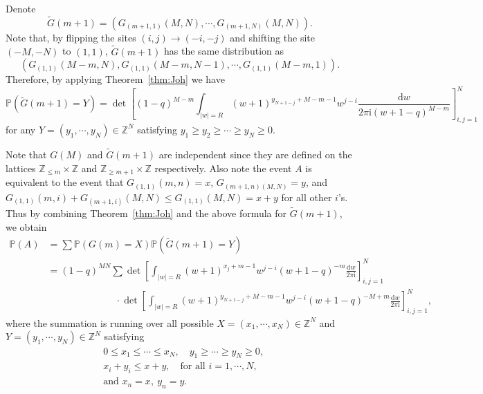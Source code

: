 \documentclass{article}
\numberwithin{equation}{section}
\newcommand{\ddbar}[2]{\frac{{\mathrm d}#1}{2\pi {\mathrm i}#2}}
\newcommand{\intZ}{\mathbb{Z}}
\newcommand{\prob}{\mathbb{P}}
\begin{document}
Denote
\begin{equation*}
	\tilde G(m+1) = \left( G_{(m+1,1)}(M,N),\cdots,G_{(m+1,N)}(M,N)\right).
\end{equation*}
Note that, by flipping the sites $(i,j)\to (-i,-j)$ and shifting the site $(-M,-N)$ to $(1,1)$, $\tilde G(m+1)$ has the same distribution as 
\begin{equation*}
	\left(G_{(1,1)}(M-m,N),G_{(1,1)}(M-m,N-1),\cdots,G_{(1,1)}(M-m,1)\right).
\end{equation*}
Therefore, by applying Theorem~\ref{thm:Joh} we have
		\begin{equation*}
		\prob\left( \tilde G(m+1)=Y
		     \right)
		 =  \det
		      \left[
		           (1-q)^{M-m} \int_{|w|=R}
		                       (w+1)^{y_{N+1-j}+M-m-1}w^{j-i}
		                       \ddbar{w}{(w+1-q)^{M-m}}
		      \right]_{i,j=1}^N
	\end{equation*}
for any $Y=(y_1,\cdots,y_N)\in\intZ^N$ satisfying $y_1\ge y_2\ge\cdots\ge y_N\ge 0$.

Note that $G(M)$ and $\tilde G(m+1)$ are independent since they are defined on the lattices $\intZ_{\le m}\times\intZ$ and $\intZ_{\ge m+1}\times \intZ$ respectively. Also note the event $A$ is equivalent to the event that $G_{(1,1)}(m,n)=x$, $G_{(m+1,n)(M,N)}=y$, and $G_{(1,1)}(m,i)+G_{(m+1,i)}(M,N)\le G_{(1,1)}(M,N)=x+y$ for all other $i$'s. Thus by combining Theorem~\ref{thm:Joh} and the above formula for $\tilde G(m+1)$, we obtain
\begin{equation}
	\label{eq:PA_01}
	\begin{split}
      \prob(A)
		&= \sum \prob\left(G(m) =X \right) \prob\left( \tilde G(m+1) = Y\right)\\
		&= (1-q)^{MN} \sum   \det 
		                      \left[
		                         \int_{|w|=R}
		                           (w+1)^{x_j+m-1}w^{j-i}(w+1-q)^{-m}\ddbar{w}{}
		                      \right]_{i,j=1}^N\\
		                      &\qquad\qquad\qquad \quad \cdot
		                      \det 
		                      \left[
		                      \int_{|w|=R}
		                      (w+1)^{y_{N+1-j}+M-m-1}w^{j-i}(w+1-q)^{-M+m}\ddbar{w}{}
		                      \right]_{i,j=1}^N,
	\end{split}
\end{equation}
where the summation is running over all possible $X=(x_1,\cdots,x_N)\in\intZ^N$ and $Y=(y_1,\cdots,y_N)\in\intZ^N$ satisfying
\begin{equation}
	\label{eq:XY_bounds}
	\begin{split}
	&0\le x_1\le\cdots\le x_N, \quad	y_1\ge\cdots\ge y_N\ge 0,\\			
	&x_i+y_i \le x+y, \quad \text{for all } i=1,\cdots,N,\\
	&\text{and }		x_n=x,\ y_n=y.
   \end{split}
\end{equation}
\end{document}

